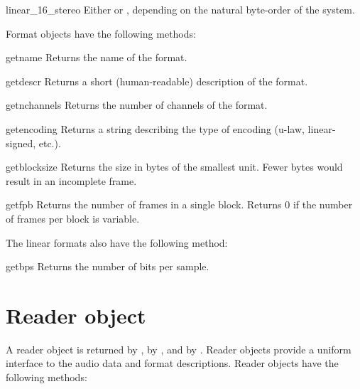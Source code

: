 \begin{datadesc}{linear_16_stereo}
Either  or ,
depending on the natural byte-order of the system.
\end{datadesc}

Format objects have the following methods:
\renewcommand{\indexsubitem}{(audioformat object methods)}

\begin{funcdesc}{getname}{}
Returns the name of the format.
\end{funcdesc}

\begin{funcdesc}{getdescr}{}
Returns a short (human-readable) description of the format.
\end{funcdesc}

\begin{funcdesc}{getnchannels}{}
Returns the number of channels of the format.
\end{funcdesc}

\begin{funcdesc}{getencoding}{}
Returns a string describing the type of encoding (u-law,
linear-signed, etc.).
\end{funcdesc}

\begin{funcdesc}{getblocksize}{}
Returns the size in bytes of the smallest unit.  Fewer bytes would
result in an incomplete frame.
\end{funcdesc}

\begin{funcdesc}{getfpb}{}
Returns the number of frames in a single block.  Returns 0 if the
number of frames per block is variable.
\end{funcdesc}

The linear formats also have the following method:

\begin{funcdesc}{getbps}{}
Returns the number of bits per sample.
\end{funcdesc}

\section{Reader object}
\renewcommand{\indexsubitem}{(reader object methods)}

A reader object is returned by , by
, and by .
Reader objects provide a uniform interface to the audio data and
format descriptions.  Reader objects have the following methods:

